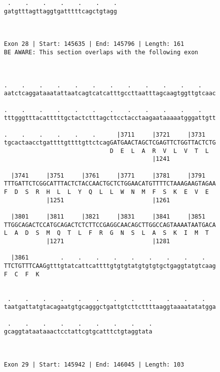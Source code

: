 \documentclass{article}
\begin{document}
\begin{Verbatim}
 .    .    .    .    .    .    .
gatgtttagttaggtgatttttcagctgtagg
                                
                                
 
Exon 28 | Start: 145635 | End: 145796 | Length: 161
BE AWARE: This section overlaps with the following exon



.    .    .    .    .    .    .    .    .    .    .    .    
aatctcaggataaatattaatcagtcatcatttgccttaatttagcaagtggttgtcaac
                                                            
.    .    .    .    .    .    .    .    .    .    .    .    
tttgggtttacatttttgctactctttagcttcctacctaagaataaaaatgggattgtt
                                                            
.    .    .    .    .    .      |3711     |3721     |3731   
tgcactaacctgattttgttttgttctcagGATGAACTAGCTCGAGTTCTGGTTACTCTG
                              D  E  L  A  R  V  L  V  T  L  
                                          |1241             
  
  |3741     |3751     |3761     |3771     |3781     |3791   
TTTGATTCTCGGCATTTACTCTACCAACTGCTCTGGAACATGTTTTCTAAAGAAGTAGAA
F  D  S  R  H  L  L  Y  Q  L  L  W  N  M  F  S  K  E  V  E  
            |1251                         |1261             
  
  |3801     |3811     |3821     |3831     |3841     |3851   
TTGGCAGACTCCATGCAGACTCTCTTCCGAGGCAACAGCTTGGCCAGTAAAATAATGACA
L  A  D  S  M  Q  T  L  F  R  G  N  S  L  A  S  K  I  M  T  
            |1271                         |1281             
  
  |3861         .    .    .    .    .    .    .    .    .   
TTCTGTTTCAAGgtttgtatcattcattttgtgtgtatgtgtgtgctgaggtatgtcaag
F  C  F  K                                                  
                                                            
  
 .    .    .    .    .    .    .    .    .    .    .    .   
taatgattatgtacagaatgtgcagggctgattgtcttcttttaaggtaaaatatatgga
                                                            
 .    .    .    .    .    .    .    .    .
gcaggtataataaactcctattcgtgcatttctgtaggtata
                                          
                                          
 
Exon 29 | Start: 145942 | End: 146045 | Length: 103




\end{Verbatim}
\end{document}
